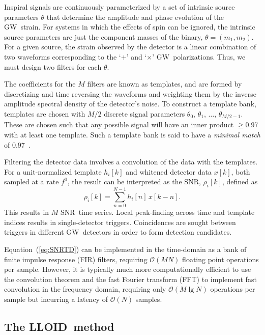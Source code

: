\documentclass[preprint2]{aastex}
\newcommand{\GW}{GW}%
\newcommand{\SNR}{SNR}%
\newcommand{\tmpsamps}{\ensuremath{N}}
\newcommand{\numtmps}{\ensuremath{M}}
\newcommand{\fir}{FIR}%
\newcommand{\fft}{FFT}%
\newcommand{\lloid}{LLOID}%
\begin{document}
Inspiral signals are continuously parameterized by a set of intrinsic source
parameters $\theta$ that determine the amplitude and phase evolution of the
\GW\ strain. For systems in which the effects of spin can be ignored, the intrinsic
source parameters are just the component masses of the binary,
 $\theta = (m_1, m_2)$. For a given source, the strain observed by the
 detector is a linear combination of two waveforms corresponding to the
`$+$' and `$\times$' \GW\ polarizations.  Thus, we must design two filters
for each $\theta$.

The coefficients for the $\numtmps$ filters are known as templates, 
and are formed by discretizing and time reversing the
waveforms and weighting them by the inverse amplitude spectral density of the
detector's noise.
To construct a template bank, templates are chosen with
$\numtmps/2$ discrete signal parameters $\theta_0,\, \theta_1,\, \dots,\,
\theta_{\numtmps/2-1}$. These are chosen such that any possible signal
will have an inner product $\geqslant$0.97 with at least one template.
Such a template bank is said to have a {\em minimal match} of 0.97~\citep{Owen:1998dk}.

Filtering the detector data involves a convolution of the data with the
templates.  For a unit-normalized template $h_i[k]$ and whitened detector data
$x[k]$, both sampled at a rate $f^0$, the result can be interpreted as the
\SNR, $\rho_i[k]$, defined as
%
%
\begin{equation}
	\label{eq:SNRTD}
	\rho_i [k] = \sum_{n=0}^{N-1} h_{i}[n] \, x [k-n].
\end{equation}
This results in $\numtmps$ \SNR\ time series. Local peak-finding across time and
template indices results in single-detector triggers.  Coincidences are sought
between triggers in different \GW\ detectors in order to form detection candidates.

Equation~(\ref{eq:SNRTD}) can be implemented in the time-domain as a bank of
finite impulse response (\fir) filters, requiring $\mathcal O(\numtmps
\tmpsamps)$ floating point operations per sample.  However, it is typically
much more computationally efficient to use the convolution theorem and the
fast Fourier transform (\fft) to implement fast convolution in the frequency
domain, requiring only
$\mathcal O(\numtmps \lg \tmpsamps)$ operations per sample but incurring
a latency of $\mathcal O(\tmpsamps)$ samples.


\subsection{The \lloid\ method}
\end{document}
